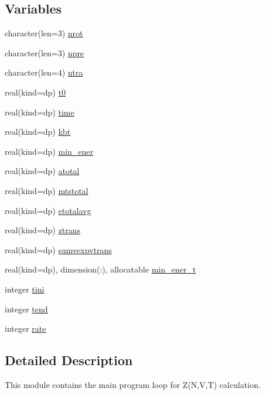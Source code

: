 \subsection*{Variables}
\begin{DoxyCompactItemize}
\item 
character(len=3) \hyperlink{namespacemod__loops_a66417533bb22418eb95ee7ebbff1f850}{nrot}
\item 
character(len=3) \hyperlink{namespacemod__loops_a920fecb79f5e908fa035a810b4d549ea}{npre}
\item 
character(len=4) \hyperlink{namespacemod__loops_a79e040eb372f8de350337242a159e2b7}{ntra}
\item 
real(kind=dp) \hyperlink{namespacemod__loops_ab6a118712ba0b676790e9cace45c35b5}{t0}
\item 
real(kind=dp) \hyperlink{namespacemod__loops_acb345fb5782ee4c7fd3c419baff2c135}{time}
\item 
real(kind=dp) \hyperlink{namespacemod__loops_a28f32cc48dca88b5eb914f3b51ff36c4}{kbt}
\item 
real(kind=dp) \hyperlink{namespacemod__loops_a17eba688dba567d251d70c4c22d9a1cb}{min\+\_\+ener}
\item 
real(kind=dp) \hyperlink{namespacemod__loops_a16597662d980828d74a9078f4b74e677}{atotal}
\item 
real(kind=dp) \hyperlink{namespacemod__loops_ae00fd72d753b56050294575eca6b68b1}{mtstotal}
\item 
real(kind=dp) \hyperlink{namespacemod__loops_ad69a647146ed54f5c84b96e742396716}{etotalavg}
\item 
real(kind=dp) \hyperlink{namespacemod__loops_a6975a502e7bc56e3b95ee8ed8db8e658}{ztrans}
\item 
real(kind=dp) \hyperlink{namespacemod__loops_a7c4cc7b204cbf0459e4519befe2b1ef5}{sumvexpvtrans}
\item 
real(kind=dp), dimension(\+:), allocatable \hyperlink{namespacemod__loops_a285da08b33e0b132d883ee82f39f6ea2}{min\+\_\+ener\+\_\+t}
\item 
integer \hyperlink{namespacemod__loops_adc96eb69b7265038868c81104240ee96}{tini}
\item 
integer \hyperlink{namespacemod__loops_a67ea99979384ac6268ae84f7bd2773ec}{tend}
\item 
integer \hyperlink{namespacemod__loops_ab4cd7025ac3ba99baaa6d706f7c7cdb7}{rate}
\end{DoxyCompactItemize}


\subsection{Detailed Description}
This module contains the main program loop for Z(\+N,\+V,\+T) calculation. 

